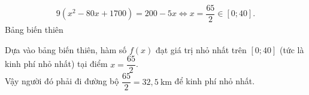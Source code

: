 \begin{ex}
{\begin{eqnarray*}
{			9\left(x^2-80 x+1700\right)=200-5 x}\Leftrightarrow x=\dfrac{65}{2} \in[0 ; 40].
	\end{eqnarray*}
	Bảng biến thiên
	\begin{center}
	\end{center}
	Dựa vào bảng biến thiên, hàm số $f(x)$ đạt giá trị nhỏ nhất trên $[0 ; 40]$ (tức là kinh phí nhỏ nhất) tại điểm $x=\dfrac{65}{2}$.\\ Vậy người đó phải đi đường bộ $\dfrac{65}{2} =32{,}5 \mathrm{~km}$ để kinh phí nhỏ nhất.
}
\end{ex}
